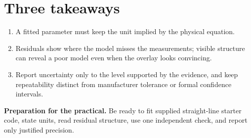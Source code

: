 \documentclass[11pt,a4paper]{article}
\begin{document}
\section*{Three takeaways}
\begin{enumerate}[nosep,leftmargin=7mm]
\item A fitted parameter must keep the unit implied by the physical equation.
\item Residuals show where the model misses the measurements; visible structure can reveal a poor model even when the overlay looks convincing.
\item Report uncertainty only to the level supported by the evidence, and keep repeatability distinct from manufacturer tolerance or formal confidence intervals.
\end{enumerate}

\begin{keybox}\textbf{Preparation for the practical.} Be ready to fit supplied straight-line starter code, state units, read residual structure, use one independent check, and report only justified precision.\end{keybox}
\end{document}
